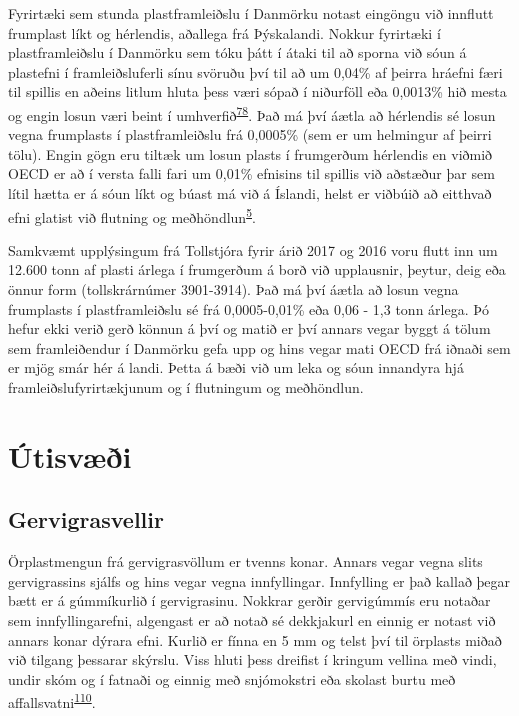 \documentclass[icelandic,]{book}
\begin{document}
Fyrirtæki sem stunda plastframleiðslu í Danmörku notast eingöngu við innflutt frumplast líkt og hérlendis, aðallega frá Þýskalandi. Nokkur fyrirtæki í plastframleiðslu í Danmörku sem tóku þátt í átaki til að sporna við sóun á plastefni í framleiðsluferli sínu svöruðu því til að um 0,04\% af þeirra hráefni færi til spillis en aðeins litlum hluta þess væri sópað í niðurföll eða 0,0013\% hið mesta og engin losun væri beint í umhverfið\textsuperscript{\protect\hyperlink{ref-lassen2015microplastics}{78}}. Það má því áætla að hérlendis sé losun vegna frumplasts í plastframleiðslu frá 0,0005\% (sem er um helmingur af þeirri tölu). Engin gögn eru tiltæk um losun plasts í frumgerðum hérlendis en viðmið OECD er að í versta falli fari um 0,01\% efnisins til spillis við aðstæður þar sem lítil hætta er á sóun líkt og búast má við á Íslandi, helst er viðbúið að eitthvað efni glatist við flutning og meðhöndlun\textsuperscript{\protect\hyperlink{ref-OECD2009}{5}}.

Samkvæmt upplýsingum frá Tollstjóra fyrir árið 2017 og 2016 voru flutt inn um 12.600 tonn af plasti árlega í frumgerðum á borð við upplausnir, þeytur, deig eða önnur form (tollskrárnúmer 3901-3914). Það má því áætla að losun vegna frumplasts í plastframleiðslu sé frá 0,0005-0,01\% eða 0,06 - 1,3 tonn árlega. Þó hefur ekki verið gerð könnun á því og matið er því annars vegar byggt á tölum sem framleiðendur í Danmörku gefa upp og hins vegar mati OECD frá iðnaði sem er mjög smár hér á landi. Þetta á bæði við um leka og sóun innandyra hjá framleiðslufyrirtækjunum og í flutningum og meðhöndlun.


\hypertarget{utisvi}{%
\section*{Útisvæði}\label{utisvi}}

\hypertarget{gervigrasvellir}{%
\subsection*{Gervigrasvellir}\label{gervigrasvellir}}

Örplastmengun frá gervigrasvöllum er tvenns konar. Annars vegar vegna slits gervigrassins sjálfs og hins vegar vegna innfyllingar. Innfylling er það kallað þegar bætt er á gúmmíkurlið í gervigrasinu. Nokkrar gerðir gervigúmmís eru notaðar sem innfyllingarefni, algengast er að notað sé dekkjakurl en einnig er notast við annars konar dýrara efni. Kurlið er fínna en 5 mm og telst því til örplasts miðað við tilgang þessarar skýrslu. Viss hluti þess dreifist í kringum vellina með vindi, undir skóm og í fatnaði og einnig með snjómokstri eða skolast burtu með affallsvatni\textsuperscript{\protect\hyperlink{ref-Wredh2014}{110}}.
\end{document}
